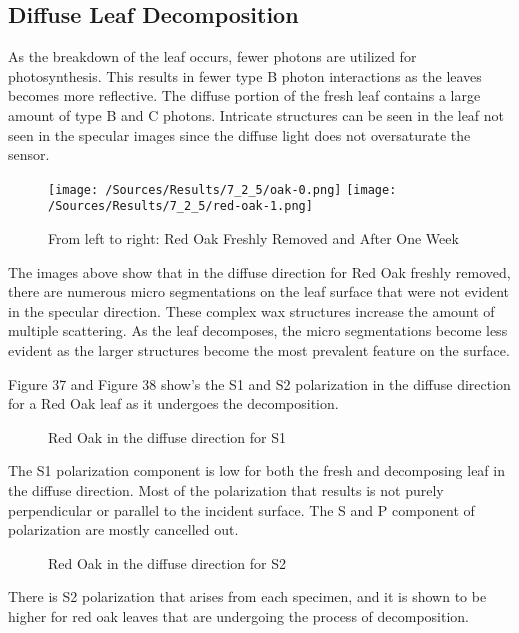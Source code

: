 \subsection{Diffuse Leaf Decomposition}
As the breakdown of the leaf occurs, fewer photons are utilized for photosynthesis.  This results in fewer type B photon interactions as the leaves becomes more reflective.  The diffuse portion of the fresh leaf contains a large amount of type B and C photons.  Intricate structures can be seen in the leaf not seen in the specular images since the diffuse light does not oversaturate the sensor.
%
\begin{figure}[htp]
    \centering
    \hspace*{\fill}%
    \texttt{[image: /Sources/Results/7\_2\_5/oak-0.png]}\hfill%
    \texttt{[image: /Sources/Results/7\_2\_5/red-oak-1.png]}
    \hspace*{\fill}%
    \caption{From left to right: Red Oak Freshly Removed and After One Week}
    \label{fig:specular-raw-decompose}
\end{figure}
%
The images above show that in the diffuse direction for Red Oak freshly removed, there are numerous micro segmentations on the leaf surface that were not evident in the specular direction.  These complex wax structures increase the amount of multiple scattering.  As the leaf decomposes, the micro segmentations become less evident as the larger structures become the most prevalent feature on the surface.

Figure 37 and Figure 38 show's the S1 and S2 polarization in the diffuse direction for a Red Oak leaf as it undergoes the decomposition.
%
\begin{figure}[!htb]
    \begin{center}
    \end{center}
    \caption{Red Oak in the diffuse direction for S1}
    \label{fig:polarization}
\end{figure}
%
The S1 polarization component is low for both the fresh and decomposing leaf in the diffuse direction.  Most of the polarization that results is not purely perpendicular or parallel to the incident surface.  The S and P component of polarization are mostly cancelled out.
%
\begin{figure}[!htb]
    \begin{center}
    \end{center}
    \caption{Red Oak in the diffuse direction for S2}
    \label{fig:polarization}
\end{figure}
%
There is S2 polarization that arises from each specimen, and it is shown to be higher for red oak leaves that are undergoing the process of decomposition.

